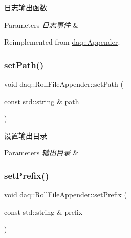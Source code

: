 日志输出函数 


\begin{DoxyParams}{Parameters}
{\em 日志事件} & \\
\hline
\end{DoxyParams}


Reimplemented from \hyperlink{classdaq_1_1Appender_a66e8f896daf7ad4a82769949b351b994}{daq\+::\+Appender}.

\mbox{\label{classdaq_1_1RollFileAppender_ac58806a64d86b2b56fa778e4a3a3d667}} 
\subsubsection{\texorpdfstring{set\+Path()}{setPath()}}
{\footnotesize\ttfamily void daq\+::\+Roll\+File\+Appender\+::set\+Path (\begin{DoxyParamCaption}\item[{const std\+::string \&}]{path }\end{DoxyParamCaption})\hspace{0.3cm}{\ttfamily [inline]}}



设置输出目录 


\begin{DoxyParams}{Parameters}
{\em 输出目录} & \\
\hline
\end{DoxyParams}
\mbox{\label{classdaq_1_1RollFileAppender_a21da274c5787fc3b33e972bb90762d86}} 
\subsubsection{\texorpdfstring{set\+Prefix()}{setPrefix()}}
{\footnotesize\ttfamily void daq\+::\+Roll\+File\+Appender\+::set\+Prefix (\begin{DoxyParamCaption}\item[{const std\+::string \&}]{prefix }\end{DoxyParamCaption})\hspace{0.3cm}{\ttfamily [inline]}}



